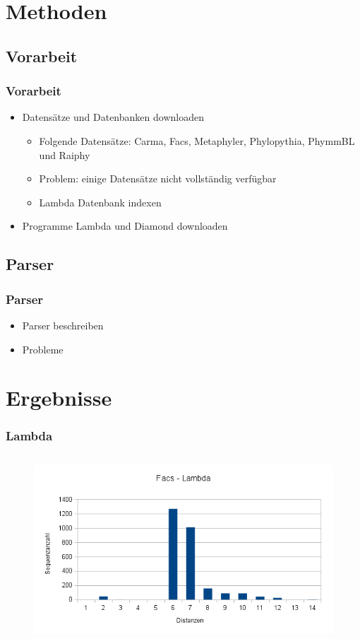 \documentclass[11pt, ngerman]{beamer}
\begin{document}
\section{Methoden}
\subsection{Vorarbeit}
\begin{frame} %
\frametitle{Vorarbeit}
\begin{itemize}
\item Datens\"atze und Datenbanken downloaden
\begin{itemize}
  \item Folgende Datens\"atze: Carma, Facs, Metaphyler, Phylopythia, PhymmBL und Raiphy
  \item Problem: einige Datens\"atze nicht vollst\"andig verf\"ugbar
  \item Lambda Datenbank indexen
\end{itemize}
\item Programme Lambda und Diamond downloaden
\end{itemize}
\end{frame}

\subsection{Parser}
\begin{frame}
\frametitle{Parser}
\begin{itemize}
\item Parser beschreiben
\item Probleme
\end{itemize}
\end{frame}
\section{Ergebnisse}
\begin{frame}
\frametitle{Lambda}
\begin{figure}
    \noindent\includegraphics[width=\linewidth,height=7cm,
keepaspectratio]{facs_verteilung.png}
\end{figure}
\end{frame}
\end{document}
